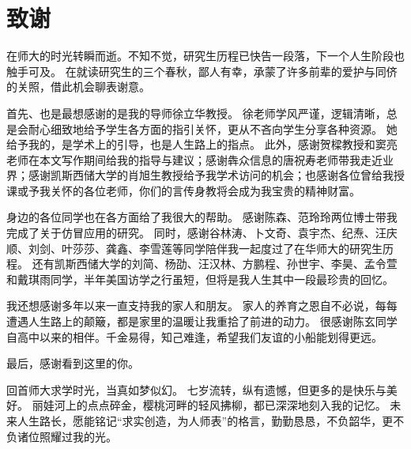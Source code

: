 \chapter*{ 致\qquad 谢}


在师大的时光转瞬而逝。不知不觉，研究生历程已快告一段落，下一个人生阶段也触手可及。
在就读研究生的三个春秋，鄙人有幸，承蒙了许多前辈的爱护与同侪的关照，借此机会聊表谢意。

首先、也是最想感谢的是我的导师徐立华教授。
徐老师学风严谨，逻辑清晰，总是会耐心细致地给予学生各方面的指引关怀，更从不吝向学生分享各种资源。
她给予我的，是学术上的引导，也是人生路上的指点。
此外，感谢贺樑教授和窦亮老师在本文写作期间给我的指导与建议；感谢犇众信息的唐祝寿老师带我走近业界；感谢凯斯西储大学的肖旭生教授给予我学术访问的机会；也感谢各位曾给我授课或予我关怀的各位老师，你们的言传身教将会成为我宝贵的精神财富。

身边的各位同学也在各方面给了我很大的帮助。
感谢陈森、范玲玲两位博士带我完成了关于仿冒应用的研究。
同时，感谢谷林涛、卜文奇、袁宇杰、纪焘、汪庆顺、刘剑、叶莎莎、龚鑫、李雪莲等同学陪伴我一起度过了在华师大的研究生历程。
还有凯斯西储大学的刘简、杨劭、汪汉林、方鹏程、孙世宇、李昊、孟令萱和戴琪雨同学，半年美国访学之行虽短，但将是我人生其中一段最珍贵的回忆。

我还想感谢多年以来一直支持我的家人和朋友。
家人的养育之恩自不必说，每每遭遇人生路上的颠簸，都是家里的温暖让我重拾了前进的动力。
很感谢陈玄同学自高中以来的相伴。千金易得，知己难逢，希望我们友谊的小船能划得更远。

最后，感谢看到这里的你。

回首师大求学时光，当真如梦似幻。
七岁流转，纵有遗憾，但更多的是快乐与美好。
丽娃河上的点点碎金，樱桃河畔的轻风拂柳，都已深深地刻入我的记忆。
未来人生路长，愿能铭记``求实创造，为人师表''的格言，勤勤恳恳，不负韶华，更不负诸位照耀过我的光。

